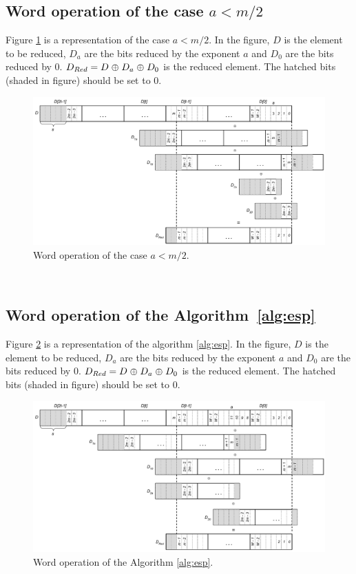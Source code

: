\subsection{Word operation of the case $a<m/2$}\label{sec:word:operation:alg:a2}
Figure \ref{fig:word:operation:alg:a2} is a representation of the case $a<m/2$. In the figure, $D$ is the element to be reduced, $D_a$ are the bits reduced by the exponent $a$ and $D_0$ are the bits reduced by $0$. $D_{Red} = D \mathrel{\oplus} D_a \mathrel{\oplus} D_0$ is the reduced element. The hatched bits (shaded in figure) should be set to 0.
\begin{figure}[htb]
  \centering
  \includegraphics[width = \columnwidth]{figures/two-elements-reduction-a-6.pdf}
\caption{Word operation of the case $a<m/2$.}
\label{fig:word:operation:alg:a2}
\end{figure}
\\

\subsection{Word operation of the  Algorithm~\ref{alg:esp}}\label{sec:word:operation:alg:esp}
Figure \ref{fig:word:operation:alg:esp} is a representation of the algorithm \ref{alg:esp}. In the figure, $D$ is the element to be reduced, $D_a$ are the bits reduced by the exponent $a$ and $D_0$ are the bits reduced by $0$. $D_{Red} = D \mathrel{\oplus} D_a \mathrel{\oplus} D_0$ is the reduced element. The hatched bits (shaded in figure) should be set to 0.
\begin{figure}[htb]
  \centering
  \includegraphics[width = \columnwidth]{figures/two-elements-reduction-a-11.pdf}
\caption{Word operation of the Algorithm \ref{alg:esp}.}
\label{fig:word:operation:alg:esp}
\end{figure}
\\

